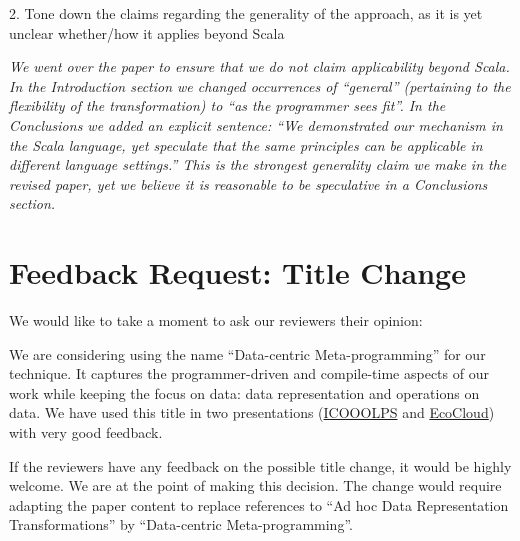 \documentclass[9pt]{article}
\newenvironment{editorial}
{ \color{Red} \framebox{{\bf REVISION}} }
{  }
\newenvironment{answer}
{ \em \framebox{{\bf AUTHOR RESPONSE}} }
{  }
\begin{document}
\begin{editorial}
2. Tone down the claims regarding the generality of the approach, as it is yet unclear whether/how it applies beyond Scala
\end{editorial}

\begin{answer}
We went over the paper to ensure that we do not claim applicability beyond Scala. In the Introduction section we changed occurrences of ``general'' (pertaining to the flexibility of the transformation) to ``as the programmer sees fit''. In the Conclusions we added an explicit sentence: ``We demonstrated our mechanism in the Scala language, yet speculate that the same principles can be applicable in different language settings.'' This is the strongest generality claim we make in the revised paper, yet we believe it is reasonable to be speculative in a Conclusions section.
\end{answer}





\section{Feedback Request: Title Change}

We would like to take a moment to ask our reviewers  their opinion:

We are considering using the name ``Data-centric Meta-programming'' for our technique. It captures the programmer-driven and compile-time aspects of our work while keeping the focus on data: data representation and operations on data. We have used this title in two presentations (\href{https://speakerdeck.com/vladureche/data-centric-metaprogramming-at-icooolps-2015}{ICOOOLPS} and \href{https://speakerdeck.com/vladureche/data-centric-metaprogramming-at-ecocloud-2015}{EcoCloud}) with very good feedback.

If the reviewers have any feedback on the possible title change, it would be highly welcome. We are at the point of making this decision. The change would require adapting the paper content to replace references to ``Ad hoc Data Representation Transformations'' by ``Data-centric Meta-programming''.
\end{document}
